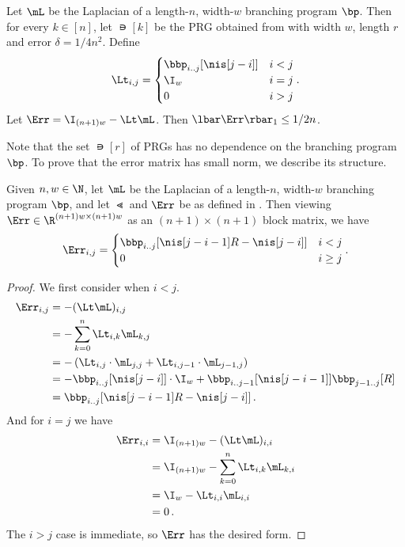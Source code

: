 \begin{proposition}\label{prop:pathErrSmall}
Let $\mL$ be the Laplacian of a length-$n$, width-$w$ branching program $\bp$. Then for every $k\in[n]$, let $\nis[k]$ be the PRG obtained from  with width $w$, length $r$ and error $\delta=1/4n^2$. Define
\[\Lt_{i,j}=\begin{cases}
\bbp_{i..j}[\nis[j-i]] & i<j\\
\I_w & i=j\\
0 & i>j
\end{cases}.\] 
Let $\Err=\I_{(n+1)w}-\Lt \mL$. Then $\lbar\Err\rbar_1\leq 1/2n$. %
\end{proposition}
%
Note that the set $\nis[r]$ of PRGs has %
no dependence on the branching program $\bp$. To prove
that  %
the error matrix has small norm, we describe its structure.
\begin{lemma}\label{lem:pathErrStruct}
Given $n,w\in \N$, let $\mL$ be the Laplacian of a length-$n$, width-$w$ branching program $\bp$, and let $\Lt$ and $\Err$ be as defined in . Then viewing $\Err\in \R^{(n+1)w\times(n+1)w}$ as an $(n+1)\times(n+1)$ block matrix, 
we have %
\[\Err_{i,j} = \begin{cases}
\bbp_{i..j}[\nis[j-i-1]R-\nis[j-i]] & i<j\\
0 & i\geq j
\end{cases}.\]
\end{lemma}
\begin{proof}
We first consider when $i<j$. %
\begin{align*}
    \Err_{i,j} &= -(\Lt \mL)_{i,j}\\
    &= -\sum_{k=0}^{n}\Lt_{i,k}\mL_{k,j}\\
    &= -\left(\Lt_{i,j}\cdot \mL_{j,j}+\Lt_{i,j-1}\cdot \mL_{j-1,j}\right)\\
    &= -\bbp_{i..j}[\nis[j-i]]\cdot \I_w+\bbp_{i..j-1}[\nis[j-i-1]]\bbp_{j-1..j}[R]\\
    &= \bbp_{i..j}[\nis[j-i-1]R-\nis[j-i]]\,.
\end{align*}
%
And for $i=j$ we have  %
\begin{align*}
    \Err_{i,i} &= \I_{(n+1)w}-(\Lt \mL)_{i,i}\\
    &= \I_{(n+1)w} - \sum_{k=0}^{n}\Lt_{i,k}\mL_{k,i}\\
    &= \I_w - \Lt_{i,i}\mL_{i,i}\\
    &= 0\,.  %
\end{align*}
The $i>j$ case is immediate, so $\Err$ has the desired form.
\end{proof}

